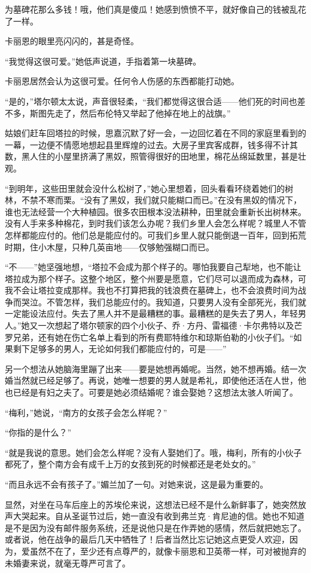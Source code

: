 \par 为墓碑花那么多钱！哦，他们真是傻瓜！她感到愤愤不平，就好像自己的钱被乱花了一样。
\par 卡丽恩的眼里亮闪闪的，甚是奇怪。
\par “我觉得这很可爱。”她低声说道，手指着第一块墓碑。
\par 卡丽恩居然会认为这很可爱。任何令人伤感的东西都能打动她。
\par “是的，”塔尔顿太太说，声音很轻柔，“我们都觉得这很合适——他们死的时间也差不多，斯图先走了，然后布伦特又举起了他掉在地上的战旗。”
\par 姑娘们赶车回塔拉的时候，思嘉沉默了好一会，一边回忆着在不同的家庭里看到的一幕，一边便不情愿地想起县里辉煌的过去。大房子里宾客成群，钱多得不计其数，黑人住的小屋里挤满了黑奴，照管得很好的田地里，棉花丛绵延数里，甚是壮观。
\par “到明年，这些田里就会没什么松树了，”她心里想着，回头看看环绕着她们的树林，不禁不寒而栗。“没有了黑奴，我们就只能糊口而已。”在没有黑奴的情况下，谁也无法经营一个大种植园。很多农田根本没法耕种，田里就会重新长出树林来。没有人手来多种棉花，到时我们该怎么办呢？我们乡里人会怎么样呢？城里人不管怎样都能应付的。他们总是能应付的。可我们乡里人就只能倒退一百年，回到拓荒时期，住小木屋，只种几英亩地——仅够勉强糊口而已。
\par “不——”她坚强地想，“塔拉不会成为那个样子的。哪怕我要自己犁地，也不能让塔拉成为那个样子。这整个地区，整个州要是愿意，它们尽可以退而成为森林，可我不会让塔拉变成那样。我也不打算把我的钱浪费在墓碑上，也不会浪费时间为战争而哭泣。不管怎样，我们总能应付的。我知道，只要男人没有全部死光，我们就一定能设法应付。失去了黑人并不是最糟糕的事。最糟糕的是失去了男人，年轻男人。”她又一次想起了塔尔顿家的四个小伙子、乔·方丹、雷福德·卡尔弗特以及芒罗兄弟，还有她在伤亡名单上看到的所有费耶特维尔和琼斯伯勒的小伙子们。“如果剩下足够多的男人，无论如何我们都能应付的，可是——”
\par 另一个想法从她脑海里蹦了出来——要是她想再婚呢。当然，她不想再婚。结一次婚当然就已经足够了。再说，她唯一想要的男人就是希礼，即使他还活在人世，他也已经是有妇之夫了。可要是她必须结婚呢？谁会娶她？这想法太骇人听闻了。
\par “梅利，”她说，“南方的女孩子会怎么样呢？”
\par “你指的是什么？”
\par “就是我说的意思。她们会怎么样呢？没有人娶她们了。哦，梅利，所有的小伙子都死了，整个南方会有成千上万的女孩到死的时候都还是老处女的。”
\par “而且永远不会有孩子了。”媚兰加了一句。对她来说，这是最为重要的。
\par 显然，对坐在马车后座上的苏埃伦来说，这想法已经不是什么新鲜事了，她突然放声大哭起来。自从圣诞节过后，她一直没有收到弗兰克·肯尼迪的信。她也不知道是不是因为没有邮件服务系统，还是说他只是在作弄她的感情，然后就把她忘了。或者说，他在战争的最后几天中牺牲了！后者当然比忘记她这点更受人欢迎，因为，爱虽然不在了，至少还有点尊严的，就像卡丽恩和卫英蒂一样，可对被抛弃的未婚妻来说，就毫无尊严可言了。

